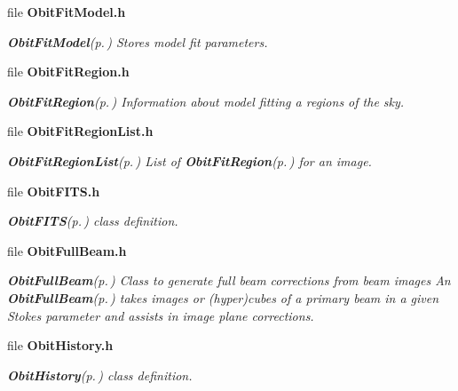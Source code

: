 \begin{CompactItemize}
\item 
file {\bf Obit\-Fit\-Model.h}
\begin{CompactList}\small\item\em {\bf Obit\-Fit\-Model}{\rm (p.\,\pageref{structObitFitModel})} Stores model fit parameters. \item\end{CompactList}

\item 
file {\bf Obit\-Fit\-Region.h}
\begin{CompactList}\small\item\em {\bf Obit\-Fit\-Region}{\rm (p.\,\pageref{structObitFitRegion})} Information about model fitting a regions of the sky. \item\end{CompactList}

\item 
file {\bf Obit\-Fit\-Region\-List.h}
\begin{CompactList}\small\item\em {\bf Obit\-Fit\-Region\-List}{\rm (p.\,\pageref{structObitFitRegionList})} List of {\bf Obit\-Fit\-Region}{\rm (p.\,\pageref{structObitFitRegion})} for an image. \item\end{CompactList}

\item 
file {\bf Obit\-FITS.h}
\begin{CompactList}\small\item\em {\bf Obit\-FITS}{\rm (p.\,\pageref{structObitFITS})} class definition. \item\end{CompactList}

\item 
file {\bf Obit\-Full\-Beam.h}
\begin{CompactList}\small\item\em {\bf Obit\-Full\-Beam}{\rm (p.\,\pageref{structObitFullBeam})} Class to generate full beam corrections from beam images An {\bf Obit\-Full\-Beam}{\rm (p.\,\pageref{structObitFullBeam})} takes images or (hyper)cubes of a primary beam in a given Stokes parameter and assists in image plane corrections. \item\end{CompactList}

\item 
file {\bf Obit\-History.h}
\begin{CompactList}\small\item\em {\bf Obit\-History}{\rm (p.\,\pageref{structObitHistory})} class definition. \item\end{CompactList}


\end{CompactItemize}
